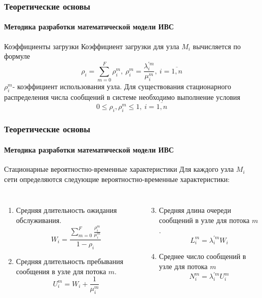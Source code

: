 \documentclass[aspectratio=169]{beamer}
\begin{document}
\begin{frame}
\frametitle{Теоретические основы}
\framesubtitle{Методика разработки математической модели ИВС}

\begin{block}{Коэффициенты загрузки}
Коэффициент загрузки для узла \( M_{i} \) вычисляется по формуле
\[ \rho_{i} = \sum\limits_{m = 0}^{F} \rho_{i}^{m}, \: \rho_{i}^{m} = \frac{\lambda_{i}^{'m}}{\mu_{i}^{m}}, \:
i = \overline{1, n} \]
\( \rho_{i}^{m} \)- коэффициент использования узла. Для существования стационарного распределения числа сообщений в системе необходимо выполнение условия
\[ 0 \leqslant \rho_{i}, \rho_{i}^{m} \leqslant 1, \: i = \overline{1, n} \]
\end{block}
\end{frame}

\begin{frame}
\frametitle{Теоретические основы}
\framesubtitle{Методика разработки математической модели ИВС}

\begin{block}{Стационарные вероятностно-временные характеристики}
Для каждого узла  \( M_{i} \) сети определяются следующие вероятностно-временные характеристики:

\begin{columns}[t]
\begin{enumerate}
\item Средняя длительность ожидания обслуживания.
	\[
		W_{i} = \frac{ \sum\limits_{m = 0}^{F} \frac{ \rho_{i}^{m} }{ \mu_{i}^{m}} }{ 1 - \rho_{i} }
	\]
	
	\item Средняя длительность пребывания сообщения в узле для потока \( m \).
	\[ U_{i}^{m} = W_{i} + \frac{1}{\mu_{i}^{m}} \]
\end{enumerate}

\begin{enumerate}
\setcounter{enumi}{2}

	\item Средняя длина очереди сообщений в узле для потока \( m \).
	\[ L_{i}^{m} = \lambda_{i}^{'m} W_{i} \]
	
	\item Среднее число сообщений в узле для потока \( m \)
	\[ N_{i}^{m} = \lambda_{i}^{'m} U_{i}^{m} \]
\end{enumerate}
\end{columns}
\end{block}
\end{frame}
\end{document}
